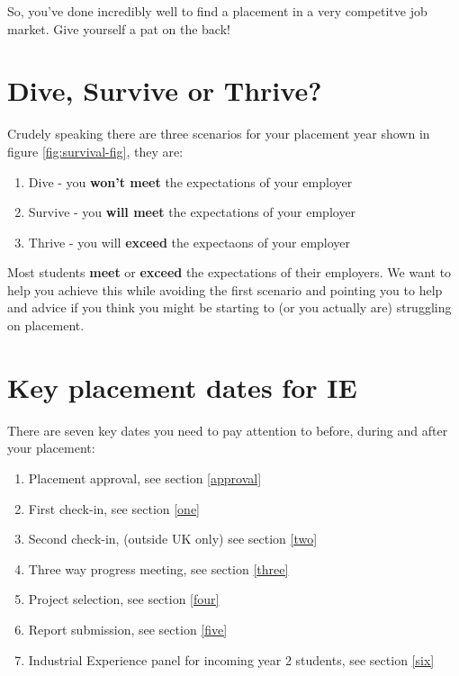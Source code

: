 \documentclass[
]{book}
\providecommand{\tightlist}{%
  \setlength{\itemsep}{0pt}\setlength{\parskip}{0pt}}
\begin{document}
So, you've done incredibly well to find a placement in a very competitve job market. Give yourself a pat on the back!

\section{Dive, Survive or Thrive?}\label{thrive}

Crudely speaking there are three scenarios for your placement year shown in figure \ref{fig:survival-fig}, they are:

\begin{enumerate}
\def\labelenumi{\arabic{enumi}.}
\tightlist
\item
  Dive - you \textbf{won't meet} the expectations of your employer
\item
  Survive - you \textbf{will meet} the expectations of your employer
\item
  Thrive - you will \textbf{exceed} the expectaons of your employer
\end{enumerate}

Most students \textbf{meet} or \textbf{exceed} the expectations of their employers. We want to help you achieve this while avoiding the first scenario and pointing you to help and advice if you think you might be starting to (or you actually are) struggling on placement.

\section{Key placement dates for IE}\label{keydates}

There are seven key dates you need to pay attention to before, during and after your placement:

\begin{enumerate}
\def\labelenumi{\arabic{enumi}.}
\tightlist
\item
  Placement approval, see section \ref{approval}
\item
  First check-in, see section \ref{one}
\item
  Second check-in, (outside UK only) see section \ref{two}
\item
  Three way progress meeting, see section \ref{three}
\item
  Project selection, see section \ref{four}
\item
  Report submission, see section \ref{five}
\item
  Industrial Experience panel for incoming year 2 students, see section \ref{six}
\end{enumerate}
\end{document}
